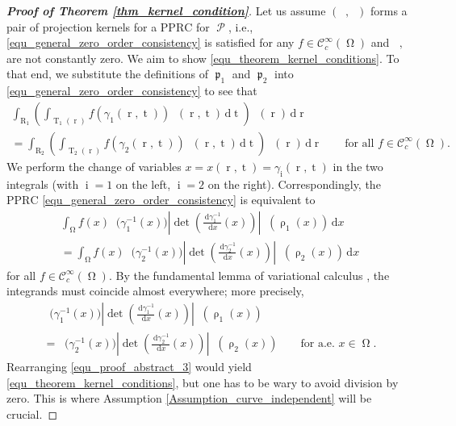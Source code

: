 \documentclass[12pt]{article}
\DeclareMathOperator{\projvariable}{i}
\DeclareMathOperator{\Proj}{\mathcal{P}}
\DeclareMathOperator{\Projind}{\mathfrak{p}}
\newcommand{\dd}[1]{\,\mathrm{d}{#1}}
\DeclareMathOperator{\tvariable}{t}
\DeclareMathOperator{\tgroundset}{T}
\DeclareMathOperator{\rayvariable}{r}
\DeclareMathOperator{\raygroundset}{R}
\DeclareMathOperator{\rayinverse}{\rho}
\DeclareMathOperator{\Vone}{V_1}
\DeclareMathOperator{\Vtwo}{V_2}
\newcommand{\conditionname}{$\mathrm{PPRC}$}
\DeclareMathOperator{\weightfkt}{\zeta}
\DeclareMathOperator{\rhoone}{\weightfkt_{1}}
\DeclareMathOperator{\rhotwo}{\weightfkt_{2}}
\DeclareMathOperator{\imgdom}{{\Omega}}
\begin{document}
\begin{proof}[\textbf{Proof of Theorem \ref{thm_kernel_condition}}]
Let us assume $(\Vone,\Vtwo)$ forms a pair of projection kernels for a \conditionname{} for $\Proj$, i.e., \eqref{equ_general_zero_order_consistency} is satisfied for any $f\in \mathcal{C}^\infty_c(\imgdom)$ and $\Vone,\Vtwo$ are not constantly zero. We aim to show \eqref{equ_theorem_kernel_conditions}. To that end, we substitute the definitions of $\Projind_1$ and $\Projind_2$ into \eqref{equ_general_zero_order_consistency} to see that
\begin{multline} \label{equ_proof_abstract_1}
\int_{\raygroundset_1} \left( \int_{\tgroundset_1(\rayvariable)} f(\gamma_{1}(\rayvariable,\tvariable)) \rhoone(\rayvariable,\tvariable) \dd \tvariable\right)\Vone(\rayvariable) \dd \rayvariable
\\= \int_{\raygroundset_2} \left( \int_{\tgroundset_2(\rayvariable)} f(\gamma_{2}(\rayvariable,\tvariable)) \rhotwo(\rayvariable,\tvariable) \dd \tvariable\right) \Vtwo(\rayvariable) \dd \rayvariable \qquad \text{for all }f\in \mathcal{C}^\infty_c(\imgdom).
\end{multline}
We perform the change of variables $x=x(\rayvariable,\tvariable)=\gamma_{\projvariable}(\rayvariable,\tvariable)$ in the two integrals (with $\projvariable=1$ on the left, $\projvariable=2$ on the right). 
Correspondingly, the \conditionname{} \eqref{equ_general_zero_order_consistency} is equivalent to
\begin{multline}\label{equ_proof_abstract_2}
\int_{\imgdom} f(x) \rhoone\big(\gamma_1^{-1}(x)\big) \left|\det\left(\frac{\dd { \gamma_{1}^{-1}}}{\dd x}(x) \right) \right| \Vone ( \rayinverse_1(x)) \dd x
\\
= \int_{\imgdom} f(x) \rhotwo\big(\gamma_2^{-1}(x)\big) \left|\det\left(\frac{\dd { \gamma_{2}^{-1}}}{\dd x}(x) \right) \right| \Vtwo ( \rayinverse_2(x)) \dd x
\end{multline}
for all $f\in \mathcal{C}^\infty_c(\imgdom)$.
By the fundamental lemma of variational calculus \cite{rgen1998calculus}, the integrands must coincide almost everywhere; more precisely,
\begin{multline}
\label{equ_proof_abstract_3}
\rhoone\big(\gamma_1^{-1}(x)\big) \left|\det\left(\frac{\dd {\gamma_{1}^{-1}}  }{\dd x} (x)\right) \right| \Vone ( \rayinverse_1(x)) 
\\ 
=
 \rhotwo\big(\gamma_2^{-1}(x)\big) \left|\det\left(\frac{\dd {\gamma_{2}^{-1}} }{\dd x}(x) \right) \right| \Vtwo ( \rayinverse_2(x))\qquad \text{for a.e. }x\in \imgdom.
\end{multline}
Rearranging \eqref{equ_proof_abstract_3} would yield \eqref{equ_theorem_kernel_conditions}, but one has to be wary to avoid division by zero. This is where Assumption \ref{Assumption_curve_independent} will be crucial.


\end{proof}
\end{document}
